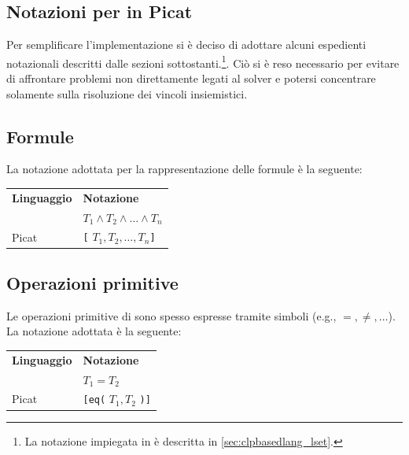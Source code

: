 \documentclass[12pt,a4paper,openright]{book} %
\begin{document}
\begin{appendices}

\chapter{Notazioni per \lset{} in Picat}
\label{ch:appendix_lset_picat_notations}

Per semplificare l'implementazione si è deciso di adottare alcuni
espedienti notazionali descritti dalle sezioni
sottostanti.\footnote{La notazione impiegata in \clpset{} è descritta
  in \ref{sec:clpbasedlang_lset}.}. Ciò si è reso necessario per evitare di
affrontare problemi non direttamente legati al solver e potersi
concentrare solamente sulla risoluzione dei vincoli insiemistici.

\section{Formule}

La notazione adottata per la rappresentazione delle formule è la
seguente:

\begin{table}[H]
\center
\begin{tabular}{ll}
\textbf{Linguaggio} & \textbf{Notazione} \\
\lset{} & $T_1 \land T_2 \land \ldots \land T_n$ \\
Picat & \verb|[| $T_1, T_2, \ldots, T_n$\verb|]| \\
\end{tabular}
\end{table}

\section{Operazioni primitive}

Le operazioni primitive di \clpset{} sono spesso espresse tramite
simboli (e.g., $=, \neq, \ldots$). La notazione adottata è la
seguente:

\begin{table}[H]
\center
\begin{tabular}{l l}
\textbf{Linguaggio} & \textbf{Notazione} \\
\lset{} & $T_1 = T_2$ \\
Picat & \verb|[eq(| $T_1, T_2$ \verb|)]| \\
\end{tabular}
\end{table}


\end{appendices}
\end{document}
